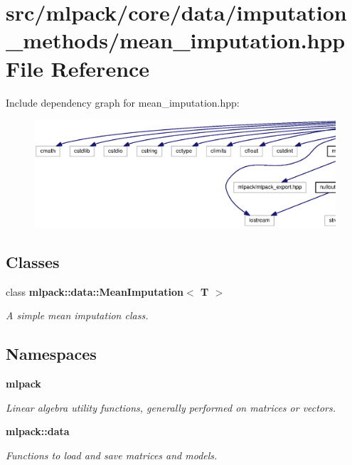 \section{src/mlpack/core/data/imputation\+\_\+methods/mean\+\_\+imputation.hpp File Reference}
\label{mean__imputation_8hpp}
Include dependency graph for mean\+\_\+imputation.\+hpp\+:
\nopagebreak
\begin{figure}[H]
\begin{center}
\leavevmode
\includegraphics[width=350pt]{mean__imputation_8hpp__incl}
\end{center}
\end{figure}
\subsection*{Classes}
\begin{DoxyCompactItemize}
\item 
class {\bf mlpack\+::data\+::\+Mean\+Imputation$<$ T $>$}
\begin{DoxyCompactList}\small\item\em A simple mean imputation class. \end{DoxyCompactList}\end{DoxyCompactItemize}
\subsection*{Namespaces}
\begin{DoxyCompactItemize}
\item 
 {\bf mlpack}
\begin{DoxyCompactList}\small\item\em Linear algebra utility functions, generally performed on matrices or vectors. \end{DoxyCompactList}\item 
 {\bf mlpack\+::data}
\begin{DoxyCompactList}\small\item\em Functions to load and save matrices and models. \end{DoxyCompactList}\end{DoxyCompactItemize}


